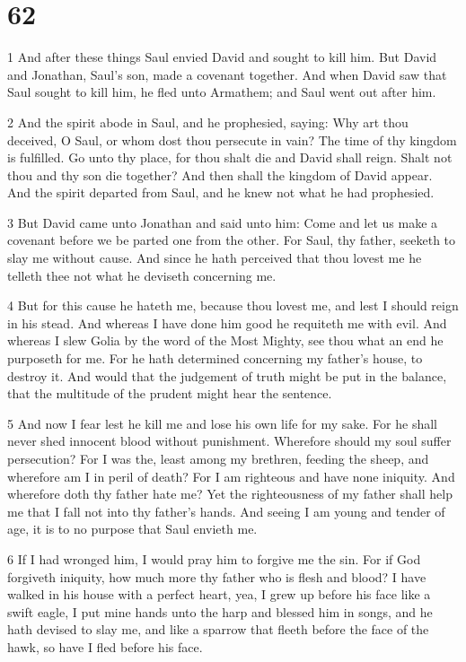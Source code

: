 \chapter{62}

\par 1 And after these things Saul envied David and sought to kill him. But David and Jonathan, Saul's son, made a covenant together. And when David saw that Saul sought to kill him, he fled unto Armathem; and Saul went out after him.

\par 2 And the spirit abode in Saul, and he prophesied, saying: Why art thou deceived, O Saul, or whom dost thou persecute in vain? The time of thy kingdom is fulfilled. Go unto thy place, for thou shalt die and David shall reign. Shalt not thou and thy son die together? And then shall the kingdom of David appear. And the spirit departed from Saul, and he knew not what he had prophesied.

\par 3 But David came unto Jonathan and said unto him: Come and let us make a covenant before we be parted one from the other. For Saul, thy father, seeketh to slay me without cause. And since he hath perceived that thou lovest me he telleth thee not what he deviseth concerning me. 

\par 4 But for this cause he hateth me, because thou lovest me, and lest I should reign in his stead. And whereas I have done him good he requiteth me with evil. And whereas I slew Golia by the word of the Most Mighty, see thou what an end he purposeth for me. For he hath determined concerning my father's house, to destroy it. And would that the judgement of truth might be put in the balance, that the multitude of the prudent might hear the sentence. 

\par 5 And now I fear lest he kill me and lose his own life for my sake. For he shall never shed innocent blood without punishment. Wherefore should my soul suffer persecution? For I was the, least among my brethren, feeding the sheep, and wherefore am I in peril of death? For I am righteous and have none iniquity. And wherefore doth thy father hate me? Yet the righteousness of my father shall help me that I fall not into thy father's hands. And seeing I am young and tender of age, it is to no purpose that Saul envieth me. 

\par 6 If I had wronged him, I would pray him to forgive me the sin. For if God forgiveth iniquity, how much more thy father who is flesh and blood? I have walked in his house with a perfect heart, yea, I grew up before his face like a swift eagle, I put mine hands unto the harp and blessed him in songs, and he hath devised to slay me, and like a sparrow that fleeth before the face of the hawk, so have I fled before his face. 

